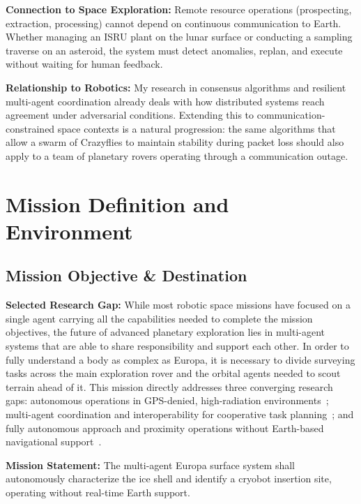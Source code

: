 \documentclass[11pt]{article}
\begin{document}
\textbf{Connection to Space Exploration:} Remote resource operations (prospecting,
extraction, processing) cannot depend on continuous communication to Earth. Whether managing an
ISRU plant on the lunar surface or conducting a sampling traverse on an asteroid, the system must
detect anomalies, replan, and execute without waiting for human feedback.

\textbf{Relationship to Robotics:} My research in consensus algorithms and resilient
multi-agent coordination already deals with how distributed systems reach agreement under
adversarial conditions. Extending this to communication-constrained space contexts is a natural
progression: the same algorithms that allow a swarm of Crazyflies to maintain stability during
packet loss should also apply to a team of planetary rovers operating through a communication
outage.

\section{Mission Definition and Environment}

\subsection{Mission Objective \& Destination}

\textbf{Selected Research Gap:} While most robotic space missions have focused on a
single agent carrying all the capabilities needed to complete the mission objectives, the future
of advanced planetary exploration lies in multi-agent systems that are able to share
responsibility and support each other. In order to fully understand a body as complex as Europa,
it is necessary to divide surveying tasks across the main exploration rover and the orbital
agents needed to scout terrain ahead of it. This mission directly addresses three converging
research gaps: autonomous operations in GPS-denied, high-radiation environments~\cite{owlDecadal};
multi-agent coordination and interoperability for cooperative task planning~\cite{stmdShortfall};
and fully autonomous approach and proximity operations without Earth-based navigational
support~\cite{nasaSBIR}.

\textbf{Mission Statement:} The multi-agent Europa surface system shall autonomously
characterize the ice shell and identify a cryobot insertion site, operating without real-time
Earth support.
\end{document}
